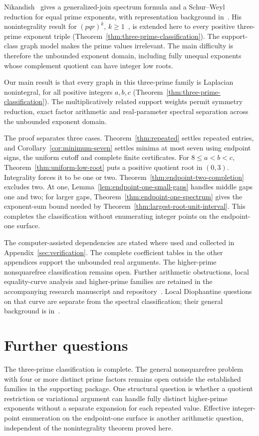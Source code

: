 \documentclass[11pt]{article}
\theoremstyle{remark}
\begin{document}
Nikandish~\cite[Theorems 13 and 30]{nikandish} gives a generalized-join spectrum formula
and a Schur--Weyl reduction for equal prime exponents, with representation
background in~\cite{fultonharris}. His nonintegrality result for $(pqr)^k$,
$k\geq1$~\cite[Corollary 31]{nikandish},
is extended here to every positive three-prime exponent triple
(Theorem~\ref{thm:three-prime-classification}).
The support-class graph model makes the prime values irrelevant.
The main difficulty is therefore the unbounded exponent domain,
including fully unequal exponents whose complement quotient can have
integer low roots.

Our main result is that every graph in this three-prime family is
Laplacian nonintegral, for all positive integers $a,b,c$
(Theorem~\ref{thm:three-prime-classification}). The multiplicatively related
support weights permit symmetry reduction, exact factor arithmetic and
real-parameter spectral separation across the unbounded exponent domain.

The proof separates three cases. Theorem~\ref{thm:repeated} settles
repeated entries, and Corollary~\ref{cor:minimum-seven} settles minima at
most seven using endpoint signs, the uniform cutoff and complete finite
certificates. For $8\leq a<b<c$, Theorem~\ref{thm:uniform-low-root}
puts a positive quotient root in $(0,3)$. Integrality forces it to be one
or two. Theorem~\ref{thm:endpoint-two-completion} excludes two. At one,
Lemma~\ref{lem:endpoint-one-small-gaps} handles middle gaps one and two;
for larger gaps, Theorem~\ref{thm:endpoint-one-spectrum} gives the
exponent-sum bound needed by Theorem~\ref{thm:largest-root-unit-interval}.
This completes the classification without enumerating integer points on
the endpoint-one surface.

The computer-assisted dependencies are stated where used and collected
in Appendix~\ref{sec:verification}. The complete coefficient tables
in the other appendices support the unbounded real arguments.
The higher-prime nonsquarefree classification remains open.
Further arithmetic obstructions, local equality-curve analysis and
higher-prime families are retained in the accompanying research
manuscript and repository~\cite{repository}. Local Diophantine
questions on that curve are separate from the spectral classification;
their general background is in~\cite{hindrysilverman,serre}.



\section{Further questions}
The three-prime classification is complete. The general nonsquarefree
problem with four or more distinct prime factors remains open outside
the established families in the supporting package. One structural
question is whether a quotient restriction or variational argument can
handle fully distinct higher-prime exponents without a separate expansion
for each repeated value. Effective integer-point enumeration on the
endpoint-one surface is another arithmetic question, independent of the
nonintegrality theorem proved here.
\end{document}
